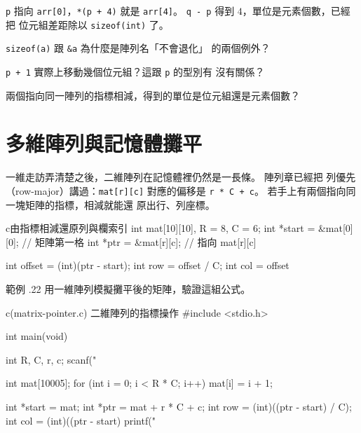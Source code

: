 
\texttt{p} 指向 \texttt{arr[0]}，\texttt{*(p + 4)} 就是
\texttt{arr[4]}。 \texttt{q - p} 得到 $4$，單位是元素個數，已經把
位元組差距除以 \texttt{sizeof(int)} 了。


\begin{drills}[label=drills:ptr-decay-arith]
\item \texttt{sizeof(a)} 跟 \texttt{\&a} 為什麼是陣列名「不會退化」
的兩個例外？
\item \texttt{p + 1} 實際上移動幾個位元組？這跟 \texttt{p} 的型別有
沒有關係？
\item 兩個指向同一陣列的指標相減，得到的單位是位元組還是元素個數？
\end{drills}

\section{多維陣列與記憶體攤平}
\label{sec:ptr-multidim}

一維走訪弄清楚之後，二維陣列在記憶體裡仍然是一長條。 陣列章已經把
列優先（row-major）講過：\texttt{mat[r][c]} 對應的偏移是
\texttt{r * C + c}。 若手上有兩個指向同一塊矩陣的指標，相減就能還
原出行、列座標。

\begin{code}{c}{由指標相減還原列與欄索引}
int mat[10][10], R = 8, C = 6;
int *start = &mat[0][0];           // 矩陣第一格
int *ptr = &mat[r][c];             // 指向 mat[r][c]

int offset = (int)(ptr - start);
int row = offset / C;
int col = offset %
\end{code}

範例 \thechapter.22 用一維陣列模擬攤平後的矩陣，驗證這組公式。

\begin{example}{c}{(matrix-pointer.c) 二維陣列的指標操作}
#include <stdio.h>

int main(void) {
    int R, C, r, c;
    scanf("%

    int mat[10005];
    for (int i = 0; i < R * C; i++) {
        mat[i] = i + 1;
    }

    int *start = mat;
    int *ptr = mat + r * C + c;
    int row = (int)((ptr - start) / C);
    int col = (int)((ptr - start) %
    printf("%
}
\end{example}

